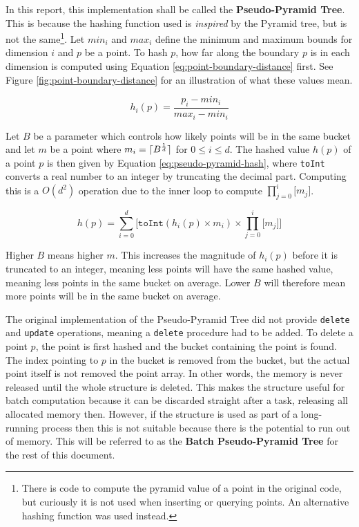 In this report, this implementation shall be called the \textbf{Pseudo-Pyramid Tree}. This is because the hashing function used is \textit{inspired} by the Pyramid tree, but is not the same\footnote{There is code to compute the pyramid value of a point in the original code, but curiously it is not used when inserting or querying points. An alternative hashing function was used instead.}. Let $min_i$ and $max_i$ define the minimum and maximum bounds for dimension $i$ and $p$ be a point. To hash $p$, how far along the boundary $p$ is in each dimension is computed using Equation \ref{eq:point-boundary-distance} first. See Figure \ref{fig:point-boundary-distance} for an illustration of what these values mean.

\begin{equation}
	h_i(p) = \frac{p_i - min_i}{max_i - min_i}
	\label{eq:point-boundary-distance}
\end{equation}

Let $B$ be a parameter which controls how likely points will be in the same bucket and let $m$ be a point where $m_i = \lceil B^{\frac{1}{d}}\rceil$ for $0 \leq i \leq d$. The hashed value $h(p)$ of a point $p$ is then given by Equation \ref{eq:pseudo-pyramid-hash},  where \texttt{toInt} converts a real number to an integer by truncating the decimal part. Computing this is a $O(d^2)$ operation due to the inner loop to compute $\prod_{j=0}^{i}{\lbrack m_j \rbrack}$.

\begin{equation}
	h(p) = \sum_{i = 0}^{d} { \lbrack \texttt{toInt}( h_i(p) \times m_i ) \times \prod_{j=0}^{i}{\lbrack m_j \rbrack} \rbrack }
	\label{eq:pseudo-pyramid-hash}
\end{equation}

Higher $B$ means higher $m$. This increases the magnitude of $h_i(p)$ before it is truncated to an integer, meaning less points will have the same hashed value, meaning less points in the same bucket on average. Lower $B$ will therefore mean more points will be in the same bucket on average.

The original implementation of the Pseudo-Pyramid Tree did not provide \texttt{delete} and \texttt{update} operations, meaning a \texttt{delete} procedure had to be added. To delete a point $p$, the point is first hashed and the bucket containing the point is found. The index pointing to $p$ in the bucket is removed from the bucket, but the actual point itself is not removed the point array. In other words, the memory is never released until the whole structure is deleted. This makes the structure useful for batch computation because it can be discarded straight after a task, releasing all allocated memory then. However, if the structure is used as part of a long-running process then this is not suitable because there is the potential to run out of memory. This will be referred to as the \textbf{Batch Pseudo-Pyramid Tree} for the rest of this document.

